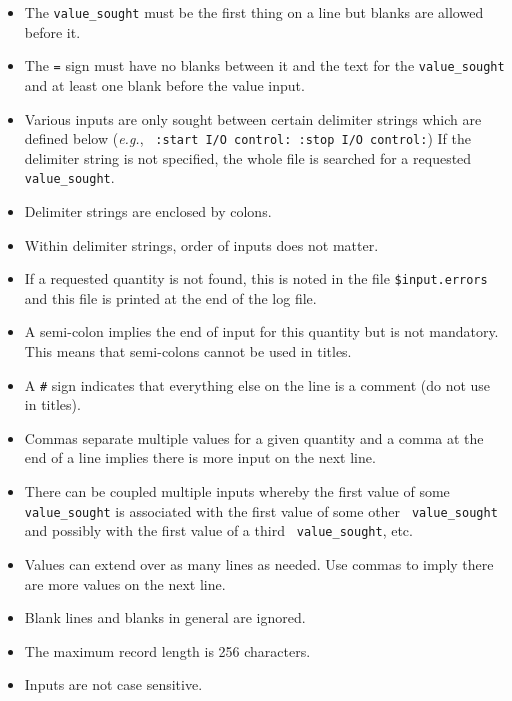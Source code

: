 \documentclass[12pt,twoside]{article}  %
\begin{document}
\begin{itemize}
\item The \verb+value_sought+ must be the first thing on a line but
blanks are allowed before it.

\item The {\tt =} sign must have no blanks between it and the text for
the \verb+value_sought+ and at least one blank before the value input.

\item Various inputs are only sought between certain delimiter strings
which are defined below ({\em e.g.},
\verb+ :start I/O control: :stop I/O control:+)
If the delimiter string is not specified, the whole file is searched for
a requested \verb+value_sought+.

\item Delimiter strings are enclosed by colons.

\item Within delimiter strings, order of inputs does not matter.

\item If a requested quantity is not found, this is noted in the file
\verb+$input.errors+ and this file is printed at the end of the log file.

\item A semi-colon implies the end of input for this quantity but is
not mandatory.  This means that semi-colons cannot be used in titles.

\item A \verb+#+ sign indicates that everything else on the line is a
comment (do not use in titles).

\item Commas separate multiple values for a given quantity and a comma
at the end of a line implies there is more input on the next line.

\item There can be coupled multiple inputs whereby the first value of some
{\tt value\_sought} is associated with the first value of some other {\tt
value\_sought} and possibly with the first value of a third {\tt
value\_sought}, etc.

\item Values can extend over as many lines as needed. Use commas to imply
there are more values on the next line.

\item Blank lines and blanks in general are ignored.

\item The maximum record length is 256 characters.

\item Inputs are not case sensitive.

\end{itemize}
\end{document}
